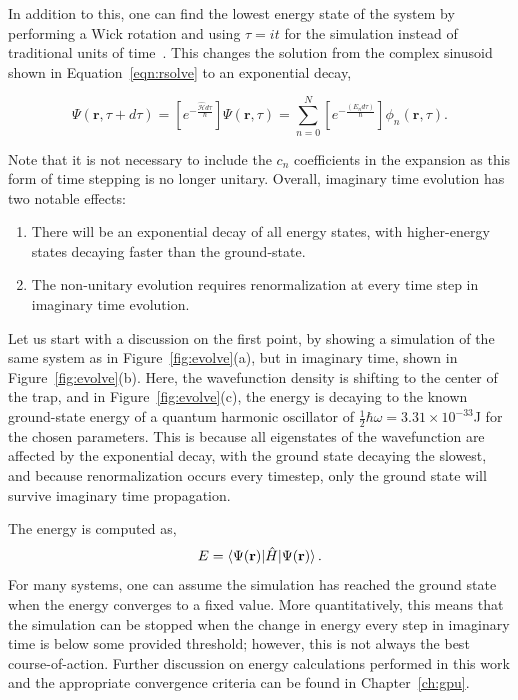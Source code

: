 In addition to this, one can find the lowest energy state of the system by performing a Wick rotation and using $\tau = it$ for the simulation instead of traditional units of time~\cite{wick1954}.
This changes the solution from the complex sinusoid shown in Equation~\eqref{eqn:rsolve} to an exponential decay,

\begin{equation}
\Psi(\mathbf{r},\tau + d\tau) = \left[e^{-\frac{\mathcal{\hat{H}}d\tau}{\hbar}}\right]\Psi(\mathbf{r},\tau) = \sum_{n=0}^N\left[e^{-\frac{(E_n d\tau)}{\hbar}}\right]\phi_n(\mathbf{r},\tau).
\end{equation}

\noindent Note that it is not necessary to include the $c_n$ coefficients in the expansion as this form of time stepping is no longer unitary.
Overall, imaginary time evolution has two notable effects:
\begin{enumerate}
\item There will be an exponential decay of all energy states, with higher-energy states decaying faster than the ground-state.
\item The non-unitary evolution requires renormalization at every time step in imaginary time evolution.
\end{enumerate}
Let us start with a discussion on the first point, by showing a simulation of the same system as in Figure~\ref{fig:evolve}(a), but in imaginary time, shown in Figure~\ref{fig:evolve}(b).
Here, the wavefunction density is shifting to the center of the trap, and
in Figure~\ref{fig:evolve}(c), the energy is decaying to the known ground-state energy of a quantum harmonic oscillator of $\frac{1}{2}\hbar\omega = 3.31\times 10^{-33}$J for the chosen parameters.
This is because all eigenstates of the wavefunction are affected by the exponential decay, with the ground state decaying the slowest, and because renormalization occurs every timestep, only the ground state will survive imaginary time propagation.

The energy is computed as,
\begin{equation}
E = \braket{\Psi(\mathbf{r})|\hat H|\Psi(\mathbf{r})}.
\label{eqn:energy}
\end{equation}
For many systems, one can assume the simulation has reached the ground state when the energy converges to a fixed value.
More quantitatively, this means that the simulation can be stopped when the change in energy every step in imaginary time is below some provided threshold; however, this is not always the best course-of-action.
Further discussion on energy calculations performed in this work and the appropriate convergence criteria can be found in Chapter~\ref{ch:gpu}.

